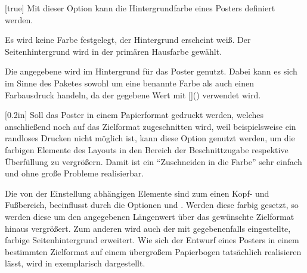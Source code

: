 \begin{DeclareEntity}{}
\begin{Declaration}
  {}
  [true]
\printdeclarationlist
%
Mit dieser Option kann die Hintergrundfarbe eines Posters definiert werden.
%
\begin{values}{}
\itemfalse[nocolor]
  Es wird keine Farbe festgelegt, der Hintergrund erscheint weiß.
\itemtrue*[color]
  Der Seitenhintergrund wird in der primären Hausfarbe  gewählt.
\item[\PValueName{Farbe}]
  Die angegebene  wird im Hintergrund für das Poster genutzt. 
  Dabei kann es sich im Sinne des Paketes  sowohl um eine 
  benannte Farbe als auch einen Farbausdruck handeln, da der gegebene Wert mit 
  []() verwendet wird.
\end{values}
\end{Declaration}

\begin{Declaration}
  {}
  [0.2in]
Soll das Poster in einem Papierformat gedruckt werden, welches anschließend 
noch auf das Zielformat zugeschnitten wird, weil beispielsweise ein randloses 
Drucken nicht möglich ist, kann diese Option genutzt werden, um die farbigen 
Elemente des Layouts in den Bereich der Beschnittzugabe respektive Überfüllung 
zu vergrößern. Damit ist ein \enquote{Zuschneiden in die Farbe} sehr einfach 
und ohne große Probleme realisierbar.

Die von der Einstellung  abhängigen 
Elemente sind zum einen Kopf- und Fußbereich, beeinflusst durch die Optionen 
 und . Werden diese farbig gesetzt, so werden 
diese um den angegebenen Längenwert über das gewünschte Zielformat hinaus 
vergrößert. Zum anderen wird auch der mit  gegebenenfalls 
eingestellte, farbige Seitenhintergrund erweitert. Wie sich der Entwurf eines 
Posters in einem bestimmten Zielformat auf einem übergroßem Papierbogen 
tatsächlich realisieren lässt, wird in  exemplarisch 
dargestellt.
\end{Declaration}




\end{DeclareEntity}
